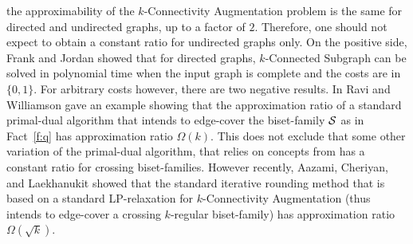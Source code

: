 the approximability of the {\sf $k$-Connectivity Augmentation} problem is the same 
for directed and undirected graphs, up to a factor of $2$. 
Therefore, one should not expect to obtain a constant ratio for undirected graphs only. 
On the positive side, Frank and Jordan \cite{FJ} showed that for directed graphs, {\sf $k$-Connected Subgraph} 
can be solved in polynomial time when the input graph is complete and the costs are in $\{0,1\}$.
For arbitrary costs however, there are two negative results.
In \cite{RWe} Ravi and Williamson gave an example showing that the approximation
ratio of a standard primal-dual algorithm that intends to edge-cover 
the biset-family ${\cal S}$ as in Fact~\ref{f:q} has approximation ratio $\Omega(k)$.
This does not exclude that some other variation of the primal-dual algorithm, that relies on concepts from \cite{FJ}
has a constant ratio for crossing biset-families.
However recently, Aazami, Cheriyan, and Laekhanukit \cite{ACL} showed that the standard iterative 
rounding method that is based on a standard LP-relaxation for {\sf $k$-Connectivity Augmentation}
(thus intends to edge-cover a crossing $k$-regular biset-family) has approximation ratio $\Omega(\sqrt{k})$. 



